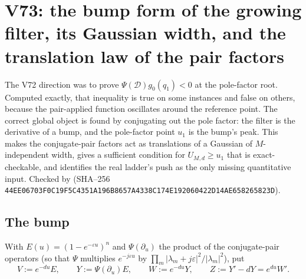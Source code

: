 \documentclass[11pt]{article}
\theoremstyle{definition}
\theoremstyle{remark}
\begin{document}




\clearpage
\section{V73: the bump form of the growing filter, its Gaussian width, and the translation law of the pair factors}
\label{sec:f2v73-bump}
\begingroup
\setcounter{equation}{0}
\renewcommand{\theequation}{N73.\arabic{equation}}
\renewcommand{\theHequation}{f2v73.\arabic{equation}}

The V72 direction was to prove \(\Psi(\mathcal D)g_0(q_1)<0\) at the
pole-factor root.  Computed exactly, that inequality is true on some
instances and false on others, because the pair-applied function
oscillates around the reference point.  The correct global object is
found by conjugating out the pole factor: the filter is the derivative of
a bump, and the pole-factor point \(u_1\) is the bump's peak.  This makes
the conjugate-pair factors act as translations of a Gaussian of
\(M\)-independent width, gives a sufficient condition for
\(U_{M,d}\ge u_1\) that is exact-checkable, and identifies the real
ladder's push as the only missing quantitative input.  Checked by
 (SHA--256
\texttt{44EE06703F0C19F5C4351A196B8657A4}\allowbreak\texttt{338C174E192060422D14AE658265823D}).

\subsection{The bump}

With \(E(u)=(1-e^{-\varepsilon u})^n\) and \(\Psi(\partial_u)\) the product
of the conjugate-pair operators (so that \(\Psi\) multiplies \(e^{-j\varepsilon u}\)
by \(\prod_m|\lambda_m+j\varepsilon|^2/|\lambda_m|^2\)), put
\begin{equation}
 V:=e^{-du}E,\qquad Y:=\Psi(\partial_u)E,\qquad W:=e^{-du}Y,\qquad
 Z:=Y'-dY=e^{du}W' .
 \label{eq:f2v73-defs}
\end{equation}
\end{document}
